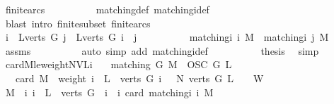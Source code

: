 \begin{isabellebody}
\ finite{\isacharunderscore}arcs\isanewline
\ \ \ \ \ \ \ \ \isamarkupfalse%
\ matching{\isacharunderscore}def\ matching{\isacharunderscore}i{\isacharunderscore}def\isanewline
\ \ \ \ \ \ \ \ \isamarkupfalse%
\ {\isacharparenleft}blast\ intro{\isacharcolon}\ finite{\isacharunderscore}subset\ finite{\isacharunderscore}arcs{\isacharparenright}\isanewline
\ \ \ \ \isamarkupfalse%
\ \isanewline
\ \ \ \ \ \ \isamarkupfalse%
\ {\isachardoublequoteopen}{\isasymforall}i\ {\isasymin}\ L{\isacharbackquote}verts\ G{\isachardot}\ {\isasymforall}j\ {\isasymin}\ L{\isacharbackquote}verts\ G{\isachardot}\ i\ {\isasymnoteq}\ j\ {\isasymlongrightarrow}\ \isanewline
\ \ \ \ \ \ \ \ matching{\isacharunderscore}i\ i\ M\ {\isasyminter}\ matching{\isacharunderscore}i\ j\ M\ {\isacharequal}\ {\isacharbraceleft}{\isacharbraceright}{\isachardoublequoteclose}\ \isamarkupfalse%
\ assms\isanewline
\ \ \ \ \ \ \ \ \isamarkupfalse%
\ {\isacharparenleft}auto\ simp\ add{\isacharcolon}\ matching{\isacharunderscore}i{\isacharunderscore}def{\isacharparenright}\isanewline
\ \ \ \ \isamarkupfalse%
\isanewline
\ \ \isamarkupfalse%
\ \isamarkupfalse%
\ {\isacharquery}thesis\ \isamarkupfalse%
\ simp\isanewline
{}\isamarkupfalse%
%
\endisatagproof
{\isafoldproof}%
%
\isadelimproof
\isanewline
%
\endisadelimproof
\isanewline
{}\isamarkupfalse%
\ card{\isacharunderscore}M{\isacharunderscore}le{\isacharunderscore}weight{\isacharunderscore}NVLi{\isacharcolon}\isanewline
\ \ \ {\isachardoublequoteopen}matching\ G\ M{\isachardoublequoteclose}\ \ {\isachardoublequoteopen}OSC\ G\ L{\isachardoublequoteclose}\isanewline
\ \ \ {\isachardoublequoteopen}card\ M\ {\isasymle}\ weight\ {\isacharbraceleft}i\ {\isasymin}\ L\ {\isacharbackquote}\ verts\ G{\isachardot}\ i\ {\isachargreater}\ {}{\isacharbraceright}\ {\isacharparenleft}N\ {\isacharparenleft}verts\ G{\isacharparenright}\ L{\isacharparenright}{\isachardoublequoteclose}\ {\isacharparenleft}\ {\isachardoublequoteopen}{\isacharunderscore}\ {\isasymle}\ {\isacharquery}W{\isachardoublequoteclose}{\isacharparenright}\isanewline
%
\isadelimproof
%
\endisadelimproof
%
\isatagproof
{}\isamarkupfalse%
\ {\isacharminus}\isanewline
\ \ \isamarkupfalse%
\ {\isacharquery}M{}{}\ {\isacharequal}\ {\isachardoublequoteopen}{\isasymSum}i{\isacharbar}\ i\ {\isasymin}\ L\ {\isacharbackquote}\ verts\ G\ {\isasymand}\ {\isacharparenleft}i{\isacharequal}{}\ {\isasymor}\ i{\isacharequal}{}{\isacharparenright}{\isachardot}\ card\ {\isacharparenleft}matching{\isacharunderscore}i\ i\ M{\isacharparenright}{\isachardoublequoteclose}\isanewline

\end{isabellebody}
